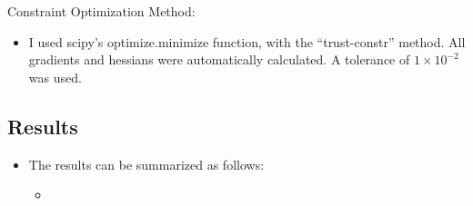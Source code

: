 \documentclass[a4paper]{article}
\begin{document}
Constraint Optimization Method:
\begin{itemize}
    \item I used scipy's optimize.minimize function, with the ``trust-constr''
        method. All gradients and hessians were automatically calculated. A
        tolerance of $1 \times 10^{-2}$ was used.
\end{itemize}
\subsection*{Results}
\begin{centering}
\end{centering}
\begin{itemize}
    \item The results can be summarized as follows:
    \begin{itemize}
        \item 
    \end{itemize}
\end{itemize}
\end{document}
